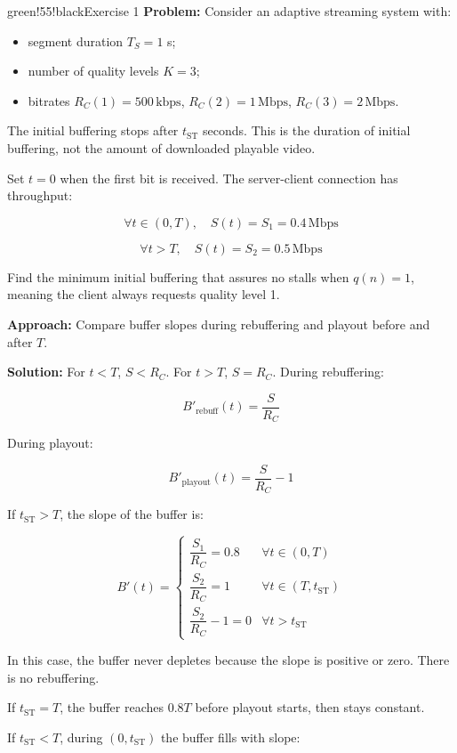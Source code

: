 \begin{calloutbox}{green!55!black}{Exercise 1}
\textbf{Problem:} Consider an adaptive streaming system with:

\begin{itemize}
\item segment duration $T_S = 1$ s;
\item number of quality levels $K = 3$;
\item bitrates $R_C(1) = 500\,\text{kbps}$, $R_C(2) = 1\,\text{Mbps}$, $R_C(3) = 2\,\text{Mbps}$.
\end{itemize}

The initial buffering stops after $t_{\text{ST}}$ seconds. This is the duration of initial buffering, not the amount of downloaded playable video.

Set $t=0$ when the first bit is received. The server-client connection has throughput:

\[
\forall t \in (0,T),\quad S(t) = S_1 = 0.4\,\text{Mbps}
\]

\[
\forall t > T,\quad S(t) = S_2 = 0.5\,\text{Mbps}
\]

Find the minimum initial buffering that assures no stalls when $q(n)=1$, meaning the client always requests quality level 1.

\textbf{Approach:} Compare buffer slopes during rebuffering and playout before and after $T$.

\textbf{Solution:} For $t<T$, $S < R_C$. For $t>T$, $S = R_C$. During rebuffering:

\[
B'_{\text{rebuff}}(t) = \frac{S}{R_C}
\]

During playout:

\[
B'_{\text{playout}}(t) = \frac{S}{R_C} - 1
\]

If $t_{\text{ST}} > T$, the slope of the buffer is:

\[
B'(t) =
\begin{cases}
\dfrac{S_1}{R_C} = 0.8 & \forall t \in (0,T) \\
\dfrac{S_2}{R_C} = 1 & \forall t \in (T,t_{\text{ST}}) \\
\dfrac{S_2}{R_C} - 1 = 0 & \forall t > t_{\text{ST}}
\end{cases}
\]

In this case, the buffer never depletes because the slope is positive or zero. There is no rebuffering.

If $t_{\text{ST}} = T$, the buffer reaches $0.8T$ before playout starts, then stays constant.

If $t_{\text{ST}} < T$, during $(0,t_{\text{ST}})$ the buffer fills with slope:


\end{calloutbox}
